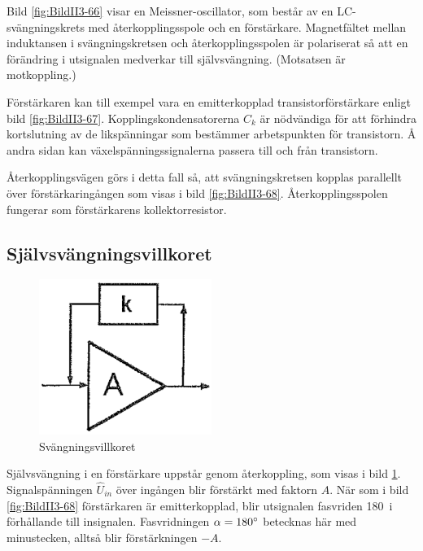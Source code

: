 Bild \ref{fig:BildII3-66} visar en Meissner-oscillator, som består av en
LC-svängningskrets med återkopplingsspole och en förstärkare.
Magnetfältet mellan induktansen i svängningskretsen och återkopplingsspolen är
polariserat så att en förändring i utsignalen medverkar till självsvängning.
(Motsatsen är motkoppling.)

Förstärkaren kan till exempel vara en emitterkopplad transistorförstärkare enligt bild
\ref{fig:BildII3-67}.
Kopplingskondensatorerna \(C_k\) är nödvändiga för att förhindra kortslutning
av de likspänningar som bestämmer arbetspunkten för transistorn.
Å andra sidan kan växelspänningssignalerna passera till och från transistorn.

Återkopplingsvägen görs i detta fall så, att svängningskretsen kopplas
parallellt över förstärkaringången som visas i bild \ref{fig:BildII3-68}.
Återkopplingsspolen fungerar som förstärkarens kollektorresistor.

\subsection{Självsvängningsvillkoret}

\begin{figure}
\includegraphics[width=0.5\textwidth]{images/cropped_pdfs/bild_2_3-69.pdf}
\caption{Svängningsvillkoret}
\label{fig:BildII3-69}
\end{figure}

Självsvängning i en förstärkare uppstår genom återkoppling, som visas i
bild \ref{fig:BildII3-69}.
Signalspänningen \(\hat{U}_{in}\) över ingången blir förstärkt med
faktorn \(A\).
När som i bild \ref{fig:BildII3-68} förstärkaren är emitterkopplad, blir
utsignalen fasvriden 180\degree~i förhållande till insignalen.
Fasvridningen \(\alpha=180\degree\) betecknas här med minustecken, alltså blir
förstärkningen \(-A\).

